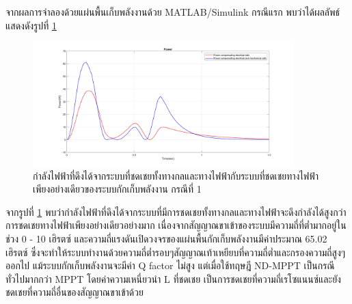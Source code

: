 \documentclass[11pt,a4paper]{article}
\begin{document}
จากผลการจำลองด้วยแผ่นพื้นเก็บพลังงานด้วย MATLAB/Simulink กรณีแรก พบว่าได้ผลลัพธ์ แสดงดังรูปที่ \ref{power_dc_case1}
\begin{figure}[H]
    \begin{center}
        \includegraphics[width=0.9\textwidth]{power_dc_case1.jpg}
    \end{center}
    \caption{กำลังไฟฟ้าที่ดึงได้จากระบบที่ชดเชยทั้งทางกลและทางไฟฟ้ากับระบบที่ชดเชยทางไฟฟ้าเพียงอย่างเดียวของระบบกักเก็บพลังงาน กรณีที่ 1}
    \label{power_dc_case1}
\end{figure}
จากรูปที่ \ref{power_dc_case1} พบว่ากำลังไฟฟ้าที่ดึงได้จากระบบที่มีการชดเชยทั้งทางกลและทางไฟฟ้าจะดึงกำลังได้สูงกว่าการชดเชยทางไฟฟ้าเพียงอย่างเดียวอย่างมาก เนื่องจากสัญญาณขาเข้าของระบบมีความถี่ที่ต่ำมากอยู่ในช่วง 0 - 10 เฮิรตซ์ และความถี่แรงดันเปิดวงจรของแผ่นพื้นกักเก็บพลังงานมีค่าประมาณ  65.02 เฮิรตซ์
ซึ่งจะทำให้ระบบทำงานด้วยความถี่ต่ำรอบๆสัญญาณเท้าเหยียบที่ความถี่ต่ำและกรองความถี่สูงๆออกไป แม้ระบบกักเก็บพลังงานจะมีค่า Q factor ไม่สูง แต่เมื่อใช้ทฤษฎี ND-MPPT เป็นกรณีทั่วไปมากกว่า MPPT โดยค่าความเหนี่ยวนำ L ที่ชดเชย เป็นการชดเชยที่ความถี่เรโซแนนซ์และยังชดเชยที่ความถี่อื่นของสัญญาณขาเข้าด้วย
\end{document}
